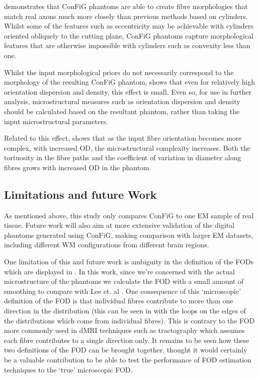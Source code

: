  demonstrates that \ac{ConFiG} phantoms are able to create fibre morphologies that match real axons much more closely than previous methods based on cylinders. Whilst some of the features such as eccentricity may be achievable with cylinders oriented obliquely to the cutting plane, \ac{ConFiG} phantoms capture morphological features that are otherwise impossible with cylinders such as convexity less than one.

Whilst the input morphological priors do not necessarily correspond to the morphology of the resulting \ac{ConFiG} phantom,  shows that even for relatively high orientation dispersion and density, this effect is small. Even so, for use in further analysis, microstructural measures such as orientation dispersion and density should be calculated based on the resultant phantom, rather than taking the input microstructural parameters.

Related to this effect,  shows that as the input fibre orientation becomes more complex, with increased \ac{OD}, the microstructural complexity increases. Both the tortuosity in the fibre paths and the coefficient of variation in diameter along fibres grows with increased \ac{OD} in the phantom. 

\subsection{Limitations and future Work}
\label{sec:micro_limitations}

As mentioned above, this study only compares \ac{ConFiG} to one \ac{EM} sample of real tissue. Future work will also aim at more extensive validation of the digital phantoms generated using \ac{ConFiG}, making comparison with larger \ac{EM} datasets, including different WM configurations from different brain regions.

One limitation of this and future work is ambiguity in the definition of the \acp{FOD} which are displayed in .
In this work, since we're concerned with the actual microstructure of the phantoms we calculate the \ac{FOD} with a small amount of smoothing to compare with Lee et. al \cite{Lee2019b}.
One consequence of this `microscopic' definition of the \ac{FOD} is that individual fibres contribute to more than one direction in the distribution (this can be seen in  with the loops on the edges of the distributions which come from individual fibres). 
This is contrary to the \ac{FOD} more commonly used in \ac{dMRI} techniques such as tractography \cite{DellAcqua2019,Schilling2019b,Tournier2007,Tournier2004} which assumes each fibre contributes to a single direction only. 
It remains to be seen how these two definitions of the \ac{FOD} can be brought together, thought it would certainly be a valuable contribution to be able to test the performance of \ac{FOD} estimation techniques to the `true' microscopic \ac{FOD}. 

